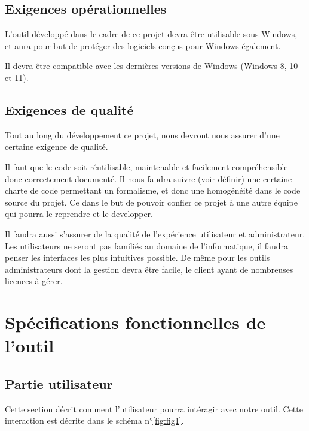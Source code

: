 \section{Exigences opérationnelles}

L'outil développé dans le cadre de ce projet devra être utilisable sous Windows, et aura pour but de protéger des logiciels conçus pour Windows également.

Il devra être compatible avec les dernières versions de Windows (Windows 8, 10 et 11).

\section{Exigences de qualité}

Tout au long du développement ce projet, nous devront nous assurer d'une certaine exigence de qualité.

Il faut que le code soit réutilisable, maintenable et facilement compréhensible donc correctement documenté.
Il nous faudra suivre (voir définir) une certaine charte de code permettant un formalisme, et donc une homogénéité dans
le code source du projet. Ce dans le but de pouvoir confier ce projet à une autre équipe qui pourra le reprendre et le developper.

Il faudra aussi s'assurer de la qualité de l'expérience utilisateur et administrateur.
Les utilisateurs ne seront pas familiés au domaine de l'informatique, il faudra penser les 
interfaces les plus intuitives possible. De même pour les outils administrateurs dont la gestion devra 
être facile, le client ayant de nombreuses licences à gérer. 

\chapter{Spécifications fonctionnelles de l'outil}

\section{Partie utilisateur}

Cette section décrit comment l'utilisateur pourra intéragir avec notre outil. Cette interaction est décrite dans le schéma n°\ref{fig:fig1}.
\newline

